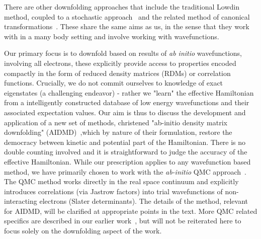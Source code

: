 There are other downfolding approaches that include the traditional Lowdin method, coupled to a stochastic 
approach~\cite{Tenno,Zhou_Ceperley} and the related method of canonical transformations~\cite{White_CT, Yanai_CT}. 
These share the same aims as us, in the sense that they work with 
in a many body setting and involve working with wavefunctions. 

Our primary focus is to downfold based on results of \emph{ab initio} wavefunctions, involving all electrons, 
these explicitly provide access to properties encoded compactly in the form of reduced 
density matrices (RDMs) or correlation functions. Crucially, we do not commit ourselves to 
knowledge of exact eigenstates (a challenging endeavor) - rather we "learn" the effective Hamiltonian from a 
intelligently constructed database of low energy wavefunctions and their associated expectation values. 
Our aim is thus to discuss the development and application of a new set of methods, christened 
"ab-initio density matrix downfolding" (AIDMD)~\cite{Changlani2015},which by nature of their formulation, 
restore the democracy between kinetic and potential part of the Hamiltonian. There is no double counting involved and it is straightforward 
to judge the accuracy of the effective Hamiltonian. While our prescription applies to any wavefunction based method, 
we have primarily chosen to work with the \emph{ab-initio} QMC approach~\cite{Ceperley_Alder,Foulkes_review}. 
The QMC method works directly in the real space continuum and explicitly introduces correlations (via Jastrow factors) 
into trial wavefunctions of non-interacting electrons (Slater determinants). 
The details of the method, relevant for AIDMD, will be clarified at appropriate points 
in the text. More QMC related specifics are described in our earlier work~\cite{Changlani2015,}, but will not be 
reiterated here to focus solely on the downfolding aspect of the work. 

